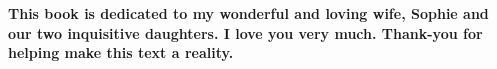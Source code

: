 
\vspace*{\fill}
\begin{center}
\textbf{This book is dedicated to my wonderful and loving wife, Sophie and our two inquisitive daughters. I love you very much. Thank-you for helping make this text a reality.}
\end{center}
\vspace*{\fill}\clearpage %
